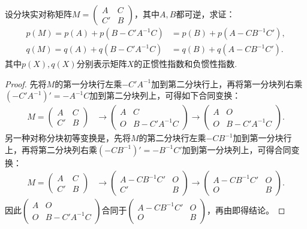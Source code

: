 \documentclass[../../main.tex]{subfiles}%
\begin{document}
\begin{proposition}[正负惯性指数的降阶公式]\label{proposition:正负惯性指数的降阶公式}
设分块实对称矩阵\(M = \begin{pmatrix}
A & C \\
C' & B
\end{pmatrix}\)，其中\(A,B\)都可逆，求证：
\begin{align*}
p(M)=p(A)+p(B - C'A^{-1}C)&=p(B)+p(A - CB^{-1}C'),\\
q(M)=q(A)+q(B - C'A^{-1}C)&=q(B)+q(A - CB^{-1}C').
\end{align*}
其中$p(X),q(X)$分别表示矩阵$X$的正惯性指数和负惯性指数.
\end{proposition}
\begin{proof}

先将\(M\)的第一分块行左乘\(-C'A^{-1}\)加到第二分块行上，再将第一分块列右乘\((-C'A^{-1})'=-A^{-1}C\)加到第二分块列上，可得如下合同变换：
\begin{align*}
M = \begin{pmatrix}
A & C \\
C' & B
\end{pmatrix}
&\rightarrow\begin{pmatrix}
A & C \\
O & B - C'A^{-1}C
\end{pmatrix}
\rightarrow\begin{pmatrix}
A & O \\
O & B - C'A^{-1}C
\end{pmatrix}.
\end{align*}
另一种对称分块初等变换是，先将\(M\)的第二分块行左乘\(-CB^{-1}\)加到第一分块行上，再将第二分块列右乘\((-CB^{-1})'=-B^{-1}C'\)加到第一分块列上，可得合同变换：
\begin{align*}
M = \begin{pmatrix}
A & C \\
C' & B
\end{pmatrix}
&\rightarrow\begin{pmatrix}
A - CB^{-1}C' & O \\
C' & B
\end{pmatrix}
\rightarrow\begin{pmatrix}
A - CB^{-1}C' & O \\
O & B
\end{pmatrix}.
\end{align*}
因此\(\begin{pmatrix}
A & O \\
O & B - C'A^{-1}C
\end{pmatrix}\)合同于\(\begin{pmatrix}
A - CB^{-1}C' & O \\
O & B
\end{pmatrix}\)，再由即得结论。

\end{proof} 
\end{document}
